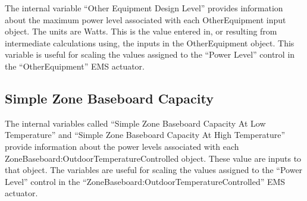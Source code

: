The internal variable ``Other Equipment Design Level'' provides information about the maximum power level associated with each OtherEquipment input object. The units are Watts. This is the value entered in, or resulting from intermediate calculations using, the inputs in the OtherEquipment object. This variable is useful for scaling the values assigned to the ``Power Level'' control in the ``OtherEquipment'' EMS actuator.

\subsection{Simple Zone Baseboard Capacity}\label{simple-zone-baseboard-capacity}

The internal variables called ``Simple Zone Baseboard Capacity At Low Temperature'' and ``Simple Zone Baseboard Capacity At High Temperature'' provide information about the power levels associated with each ZoneBaseboard:OutdoorTemperatureControlled object. These value are inputs to that object. The variables are useful for scaling the values assigned to the ``Power Level'' control in the ``ZoneBaseboard:OutdoorTemperatureControlled'' EMS actuator.
